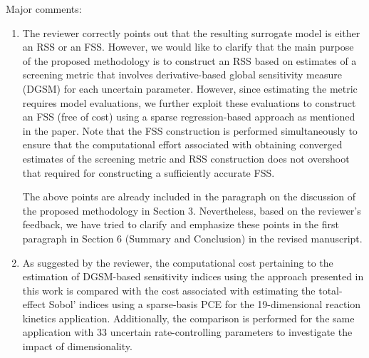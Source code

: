\documentclass[11pt,final]{article}
\newcommand{\referee}[1]{\vspace{.1ex}\noindent{\textcolor{blue}{#1}}}
\begin{document}
Major comments:
\begin{enumerate}

\item
\referee{
In this paper, the constructed surrogate model is either a RSS or a FSS. Based
on the diagram on page 12, the resulting RSS is built upon the not sufficiently
accurate FSS model (which could lead the accuracy to decrease further), or
is the RSS constructed directly from the original model with reduced input
parameters? The diagram is ambigous on this issue.}

The reviewer correctly points out that the resulting surrogate model is either an RSS or
an FSS. However, we would like to clarify that the main purpose of the proposed
methodology is to construct an RSS based on estimates of a screening metric that
involves derivative-based global sensitivity measure (DGSM) for each uncertain parameter.
However, since estimating the metric requires model evaluations, we further exploit these
evaluations to construct an FSS (free of cost) using a sparse regression-based approach
as mentioned in the paper. Note that the FSS construction is performed simultaneously to 
ensure that the computational effort associated with obtaining converged estimates of
the screening metric and RSS construction does not overshoot that required for
constructing a sufficiently accurate FSS. 

The above points are already included in the paragraph on the discussion of the proposed
methodology in Section 3. Nevertheless, based on the reviewer's feedback, we have tried to
clarify and emphasize these points in the first paragraph in Section 6 (Summary and Conclusion)
in the revised manuscript. 

\item
\referee{The reviewer would also like to see the comparison of the computational cost
(not just the numerical results) of DGSMs to variance based sensitivity indices
with increasing parameter dimension, e.g. Sobol’ indices incorporated with
sparse grid, since the difference decreases with increasing number of parameters.}

As suggested by the reviewer, the computational cost pertaining to the estimation of DGSM-based
sensitivity indices using the approach presented in this work is compared with the cost associated 
with estimating the total-effect Sobol' indices using a sparse-basis PCE
for the 19-dimensional reaction kinetics application. Additionally, the comparison is 
performed for the same application with 33 uncertain rate-controlling parameters to investigate
the impact of dimensionality. 


\end{enumerate}
\end{document}
